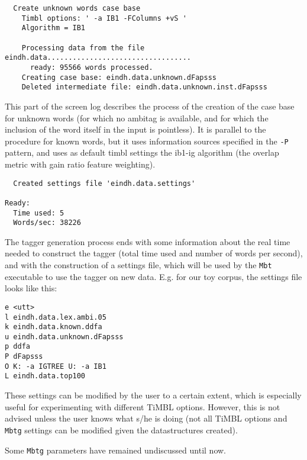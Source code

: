 \documentclass{report}
\begin{document}
{\small
\begin{verbatim}
  Create unknown words case base
    Timbl options: ' -a IB1 -FColumns +vS '
    Algorithm = IB1

    Processing data from the file eindh.data..................................
      ready: 95566 words processed.
    Creating case base: eindh.data.unknown.dFapsss
    Deleted intermediate file: eindh.data.unknown.inst.dFapsss
\end{verbatim}
}

This part of the screen log describes the process of the creation of
the case base for unknown words (for which no ambitag is available,
and for which the inclusion of the word itself in the input is
pointless). It is parallel to the procedure for known words, but it
uses information sources specified in the {\tt -P} pattern, and uses
as default {\sc timbl} settings the {\sc ib1-ig} algorithm (the
overlap metric with gain ratio feature weighting).

{\small
\begin{verbatim}
  Created settings file 'eindh.data.settings'

Ready:
  Time used: 5
  Words/sec: 38226
\end{verbatim}
}

The tagger generation process ends with some information about the
real time needed to construct the tagger (total time used and number
of words per second), and with the construction of a settings file,
which will be used by the {\tt Mbt} executable to use the tagger on
new data. E.g. for our toy corpus, the settings file looks like this:

{\small
\begin{verbatim}
e <utt>
l eindh.data.lex.ambi.05
k eindh.data.known.ddfa
u eindh.data.unknown.dFapsss
p ddfa
P dFapsss
O K: -a IGTREE U: -a IB1
L eindh.data.top100
\end{verbatim}
}

These settings can be modified by the user to a certain extent, which
is especially useful for experimenting with different TiMBL
options. However, this is not advised unless the user knows what s/he
is doing (not all TiMBL options and {\tt Mbtg} settings can be
modified given the datastructures created).

Some {\tt Mbtg} parameters have remained undiscussed until now. 
\end{document}
